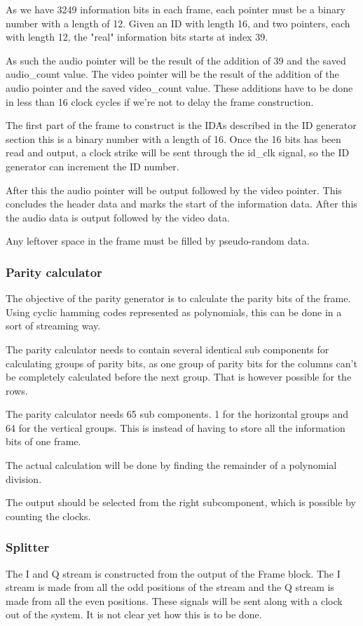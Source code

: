As we have 3249 information bits in each frame, each pointer must be a binary number with a length of 12. Given an ID with length 16, and two pointers, each with length 12, the "real" information bits starts at index 39.

As such the audio pointer will be the result of the addition of 39 and the saved audio\_count value. The video pointer will be the result of the addition of the audio pointer and the saved video\_count value. These additions have to be done in less than 16 clock cycles if we're not to delay the frame construction.

The first part of the frame to construct is the ID\. As described in the ID generator section this is a binary number with a length of 16. Once the 16 bits has been read and output, a clock strike will be sent through the id\_clk signal, so the ID generator can increment the ID number.

After this the audio pointer will be output followed by the video pointer. This concludes the header data and marks the start of the information data. After this the audio data is output followed by the video data.

Any leftover space in the frame must be filled by pseudo-random data.

\subsubsection{Parity calculator}
The objective of the parity generator is to calculate the parity bits of the frame. Using cyclic hamming codes represented as polynomials, this can be done in a sort of streaming way.

The parity calculator needs to contain several identical sub components for calculating groups of parity bits, as one group of parity bits for the columns can’t be completely calculated before the next group. That is however possible for the rows.

The parity calculator needs 65 sub components. 1 for the horizontal groups and 64 for the vertical groups. This is instead of having to store all the information bits of one frame.

The actual calculation will be done by finding the remainder of a polynomial division.

The output should be selected from the right subcomponent, which is possible by counting the clocks.

\subsubsection{Splitter}
The I and Q stream is constructed from the output of the Frame block. The I stream is made from all the odd positions of the stream and the Q stream is made from all the even positions. These signals will be sent along with a clock out of the system. It is not clear yet how this is to be done.
